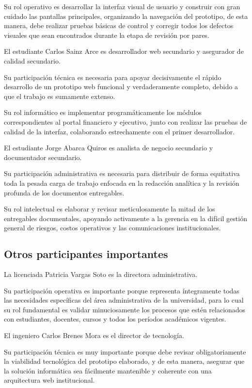 \documentclass[11pt,spanish]{article}
\begin{document}
Su rol operativo es desarrollar la interfaz visual de usuario y construir con gran cuidado las pantallas principales, organizando la navegación del prototipo, de esta manera, debe realizar pruebas básicas de control y corregir todos los defectos visuales que sean encontrados durante la etapa de revisión por pares.

El estudiante Carlos Sainz Arce es desarrollador web secundario y asegurador de calidad secundario.

Su participación técnica es necesaria para apoyar decisivamente el rápido desarrollo de un prototipo web funcional y verdaderamente completo, debido a que el trabajo es sumamente extenso.

Su rol informático es implementar programáticamente los módulos correspondientes al portal financiero y ejecutivo, junto con realizar las pruebas de calidad de la interfaz, colaborando estrechamente con el primer desarrollador.

El estudiante Jorge Abarca Quiros es analista de negocio secundario y documentador secundario.

Su participación administrativa es necesaria para distribuir de forma equitativa toda la pesada carga de trabajo enfocada en la redacción analítica y la revisión profunda de los documentos entregables.

Su rol intelectual es elaborar y revisar meticulosamente la mitad de los entregables documentales, apoyando activamente a la gerencia en la difícil gestión general de riesgos, costos operativos y las comunicaciones institucionales.

\subsection{Otros participantes importantes}

La licenciada Patricia Vargas Soto es la directora administrativa.

Su participación operativa es importante porque representa íntegramente todas las necesidades específicas del área administrativa de la universidad, para lo cual su rol fundamental es validar minuciosamente los procesos que estén relacionados con estudiantes, docentes, cursos y todos los períodos académicos vigentes.

El ingeniero Carlos Brenes Mora es el director de tecnología.

Su participación técnica es muy importante porque debe revisar obligatoriamente la viabilidad tecnológica del prototipo elaborado, y de esta manera, asegurar que la solución informática sea fácilmente mantenible y coherente con una arquitectura web institucional.
\end{document}
